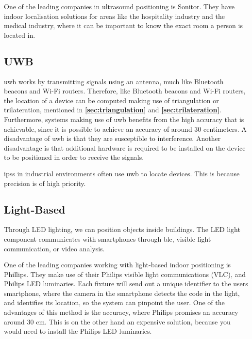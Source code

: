 One of the leading companies in ultrasound positioning is Sonitor. They have indoor localisation solutions for areas like the hospitality industry and the medical industry, where it can be important to know the exact room a person is located in. \cite{sonitor}


\subsection{UWB}
\gls{uwb} works by transmitting signals using an antenna, much like Bluetooth beacons and Wi-Fi routers. Therefore, like Bluetooth beacons and Wi-Fi routers, the location of a device can be computed making use of triangulation or trilateration, mentioned in \textbf{\autoref{sec:triangulation}} and \textbf{\autoref{sec:trilateration}}. Furthermore, systems making use of \gls{uwb} benefits from the high accuracy that is achievable, since it is possible to achieve an accuracy of around 30 centimeters. A disadvantage of \gls{uwb} is that they are susceptible to interference.\cite{oriient} Another disadvantage is that additional hardware is required to be installed on the device to be positioned in order to receive the signals\cite{LundIMU}.

\gls{ips}s in industrial environments often use \gls{uwb} to locate devices. This is because precision is of high priority.\cite{Infsoft}

\subsection{Light-Based}
Through LED lighting, we can position objects inside buildings. The LED light component communicates with smartphones through \gls{ble}, visible light communication, or video analysis.\cite{IPSMapsPeople}

One of the leading companies working with light-based indoor positioning is Phillips. They make use of their Philips visible light communications (VLC), and Philips LED luminaries. Each fixture will send out a unique identifier to the users smartphone, where the camera in the smartphone detects the code in the light, and identifies its location, so the system can pinpoint the user. \cite{philips} One of the advantages of this method is the accuracy, where Philips promises an accuracy around 30 cm. \cite{IPSMapsPeople} This is on the other hand an expensive solution, because you would need to install the Philips LED luminaries. 

